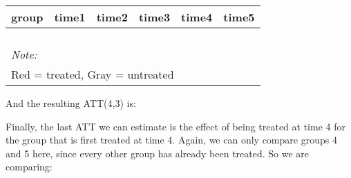 \documentclass[
]{article}
\begin{document}
\begin{table}
\centering
\begin{tabular}[t]{>{}r|>{}r|>{}r|>{}r|>{}r|>{}r}
\hline
group & time1 & time2 & time3 & time4 & time5\\
\hline
\cellcolor{white}{2} & \cellcolor{white}{0.631} & \cellcolor{white}{\textcolor{black}{0.711}} & \cellcolor{white}{\textcolor{black}{0.814}} & \cellcolor{white}{0.846} & \cellcolor{white}{0.826}\\
\hline
\cellcolor{white}{3} & \cellcolor{white}{0.678} & \cellcolor{white}{\textcolor{black}{0.770}} & \cellcolor{white}{\textcolor{black}{0.664}} & \cellcolor{white}{0.800} & \cellcolor{white}{0.784}\\
\hline
\cellcolor{white}{4} & \cellcolor{white}{0.778} & \cellcolor{red}{\textcolor{black}{0.807}} & \cellcolor{red}{\textcolor{black}{0.673}} & \cellcolor{white}{0.750} & \cellcolor{white}{0.868}\\
\hline
\cellcolor{white}{5} & \cellcolor{white}{0.854} & \cellcolor{lightgray}{\textcolor{black}{0.939}} & \cellcolor{lightgray}{\textcolor{black}{0.854}} & \cellcolor{white}{0.800} & \cellcolor{white}{0.855}\\
\hline
\multicolumn{6}{l}{\rule{0pt}{1em}\textit{Note: }}\\
\multicolumn{6}{l}{\rule{0pt}{1em}Red = treated, Gray = untreated}\\
\end{tabular}
\end{table}

And the resulting ATT(4,3) is:

Finally, the last ATT we can estimate is the effect of being treated at
time 4 for the group that is first treated at time 4. Again, we can only
compare groups 4 and 5 here, since every other group has already been
treated. So we are comparing:
\end{document}
